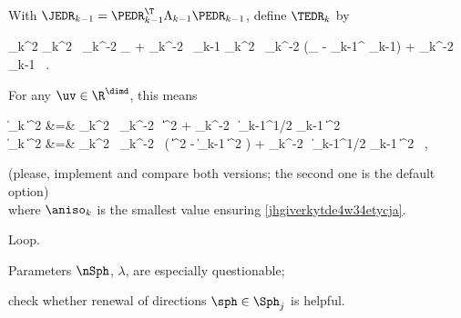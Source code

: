 \begin{mylist}
\begin{mylist}
\item
With \( \JEDR_{k-1} = \PEDR_{k-1}^{\T} \Lambda_{k-1} \PEDR_{k-1} \), define \( \TEDR_{k} \) by
\begin{EQA}[c]
	\TEDR_{k}^{2}
	\eqdef
	\aniso_{k}^{2} \, \hiso_{k}^{-2} \Id_{\dimd} + \hiso_{k}^{-2} \, \JEDR_{k-1}
	\quad
	\quad
	\aniso_{k}^{2} \, \hiso_{k}^{-2} (\Id_{\dimd} - \PEDR_{k-1}^{\T} \PEDR_{k-1}) + \hiso_{k}^{-2} \, \JEDR_{k-1}
	\, .
\end{EQA}
For any \( \uv \in \R^{\dimd} \), this means
\begin{EQA}[rcl]
	\| \TEDR_{k} \uv \|^{2}
	&=&
	\aniso_{k}^{2} \, \hiso_{k}^{-2} \, \| \uv \|^{2} + \hiso_{k}^{-2} \, \| \Lambda_{k-1}^{1/2} \PEDR_{k-1} \uv \|^{2}
	\\
	\quad
	\| \TEDR_{k} \uv \|^{2}
	&=&
	\aniso_{k}^{2} \, \hiso_{k}^{-2} \, \bigl( \| \uv \|^{2} - \| \PEDR_{k-1} \uv \|^{2} \bigr) 
	+ \hiso_{k}^{-2} \, \| \Lambda_{k-1}^{1/2} \PEDR_{k-1} \uv \|^{2}
	\, ,
\end{EQA}
{\color{blue} (please, implement and compare both versions; 
the second one is the default option)}
\\
where \( \aniso_{k} \) is the smallest value ensuring \eqref{jhgiverkytde4w34etycja}.
\end{mylist}
\item Loop.
\end{mylist}

{\color{blue} 
\begin{mylist}

\item
Parameters \( \nSph \), \( \lambda \), are especially questionable;

\item
check whether renewal of directions \( \sph \in \Sph_{j} \) is helpful.


\end{mylist}

}


